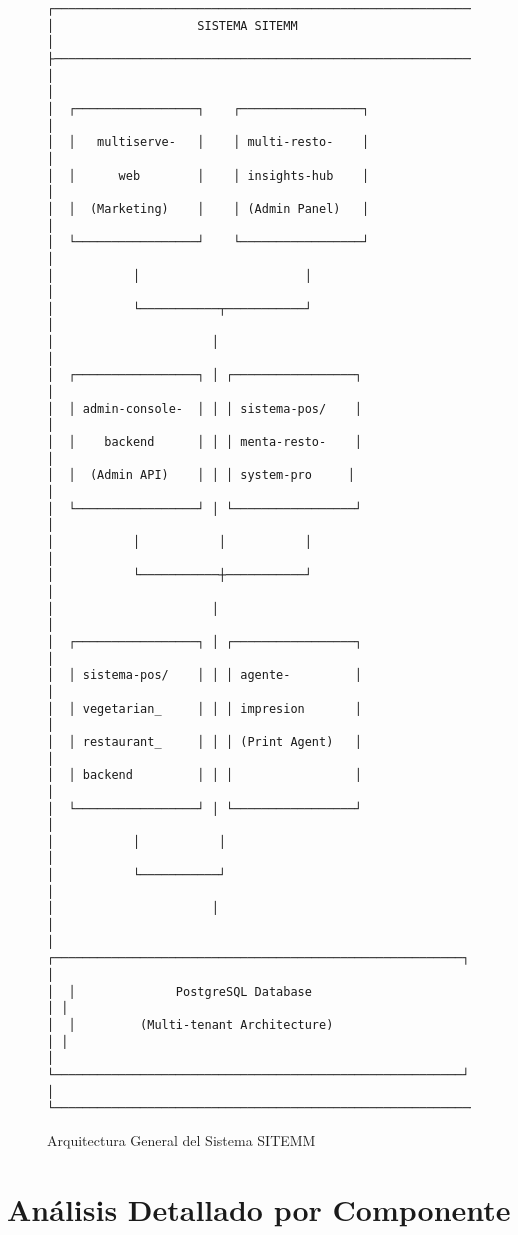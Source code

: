 \documentclass[12pt,a4paper]{article}
\begin{document}
\begin{figure}[H]
\centering
\begin{verbatim}
┌─────────────────────────────────────────────────────────────┐
│                    SISTEMA SITEMM                           │
├─────────────────────────────────────────────────────────────┤
│                                                             │
│  ┌─────────────────┐    ┌─────────────────┐                │
│  │   multiserve-   │    │ multi-resto-    │                │
│  │      web        │    │ insights-hub    │                │
│  │  (Marketing)    │    │ (Admin Panel)   │                │
│  └─────────────────┘    └─────────────────┘                │
│           │                       │                        │
│           └───────────┬───────────┘                        │
│                      │                                     │
│  ┌─────────────────┐ │ ┌─────────────────┐                │
│  │ admin-console-  │ │ │ sistema-pos/    │                │
│  │    backend      │ │ │ menta-resto-    │                │
│  │  (Admin API)    │ │ │ system-pro     │                │
│  └─────────────────┘ │ └─────────────────┘                │
│           │           │           │                        │
│           └───────────┼───────────┘                        │
│                      │                                     │
│  ┌─────────────────┐ │ ┌─────────────────┐                │
│  │ sistema-pos/    │ │ │ agente-         │                │
│  │ vegetarian_     │ │ │ impresion       │                │
│  │ restaurant_     │ │ │ (Print Agent)   │                │
│  │ backend         │ │ │                 │                │
│  └─────────────────┘ │ └─────────────────┘                │
│           │           │                                     │
│           └───────────┘                                     │
│                      │                                     │
│  ┌─────────────────────────────────────────────────────────┐ │
│  │              PostgreSQL Database                       │ │
│  │         (Multi-tenant Architecture)                     │ │
│  └─────────────────────────────────────────────────────────┘ │
└─────────────────────────────────────────────────────────────┘
\end{verbatim}
\caption{Arquitectura General del Sistema SITEMM}
\end{figure}

\section{Análisis Detallado por Componente}
\end{document}
